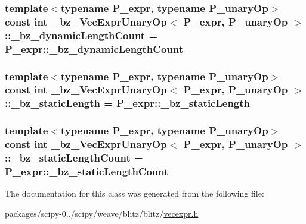 \subsubsection[{\+\_\+bz\+\_\+dynamic\+Length\+Count}]{\setlength{\rightskip}{0pt plus 5cm}template$<$typename P\+\_\+expr, typename P\+\_\+unary\+Op$>$ const int {\bf \+\_\+bz\+\_\+\+Vec\+Expr\+Unary\+Op}$<$ P\+\_\+expr, P\+\_\+unary\+Op $>$\+::\+\_\+bz\+\_\+dynamic\+Length\+Count = P\+\_\+expr\+::\+\_\+bz\+\_\+dynamic\+Length\+Count\hspace{0.3cm}{\ttfamily [static]}}\label{class__bz__VecExprUnaryOp_a4061a2047b3d8afef55df488450beed2}
\hypertarget{class__bz__VecExprUnaryOp_a58cefc7c2d9a2d902df53a3842366999}{}
\subsubsection[{\+\_\+bz\+\_\+static\+Length}]{\setlength{\rightskip}{0pt plus 5cm}template$<$typename P\+\_\+expr, typename P\+\_\+unary\+Op$>$ const int {\bf \+\_\+bz\+\_\+\+Vec\+Expr\+Unary\+Op}$<$ P\+\_\+expr, P\+\_\+unary\+Op $>$\+::\+\_\+bz\+\_\+static\+Length = P\+\_\+expr\+::\+\_\+bz\+\_\+static\+Length\hspace{0.3cm}{\ttfamily [static]}}\label{class__bz__VecExprUnaryOp_a58cefc7c2d9a2d902df53a3842366999}
\hypertarget{class__bz__VecExprUnaryOp_ab22a792405b83f0a71c9e95a90e2e2cd}{}
\subsubsection[{\+\_\+bz\+\_\+static\+Length\+Count}]{\setlength{\rightskip}{0pt plus 5cm}template$<$typename P\+\_\+expr, typename P\+\_\+unary\+Op$>$ const int {\bf \+\_\+bz\+\_\+\+Vec\+Expr\+Unary\+Op}$<$ P\+\_\+expr, P\+\_\+unary\+Op $>$\+::\+\_\+bz\+\_\+static\+Length\+Count = P\+\_\+expr\+::\+\_\+bz\+\_\+static\+Length\+Count\hspace{0.3cm}{\ttfamily [static]}}\label{class__bz__VecExprUnaryOp_ab22a792405b83f0a71c9e95a90e2e2cd}


The documentation for this class was generated from the following file\+:\begin{DoxyCompactItemize}
\item 
packages/scipy-\/0../scipy/weave/blitz/blitz/\hyperlink{vecexpr_8h}{vecexpr.\+h}\end{DoxyCompactItemize}
